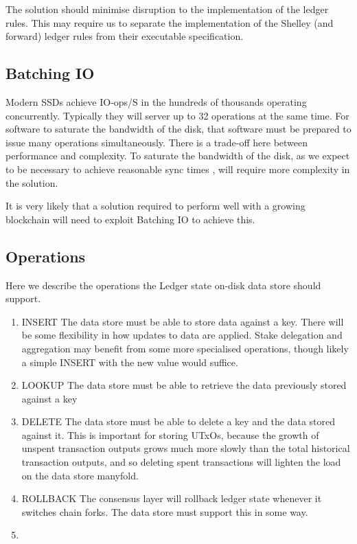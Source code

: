 \documentclass[11pt,a4paper]{article}
\begin{document}
The solution should minimise disruption to the implementation of the ledger
rules. This may require us to separate the implementation of the Shelley (and
forward) ledger rules from their executable specification.

\subsection{Batching IO}
\label{Batching IO}
Modern SSDs achieve IO-ops/S in the hundreds of thousands operating concurrently.
Typically they will server up to 32 operations at the same time. For software to
saturate the bandwidth of the disk, that software must be prepared to issue many
operations simultaneously. There is a trade-off here between performance and
complexity. To saturate the bandwidth of the disk, as we expect to be necessary
to achieve reasonable sync times , will require more complexity in
the solution.

It is very likely that a solution required to perform well with a growing
blockchain will need to exploit Batching IO to achieve this.

\subsection{Operations}
\label{Operations}
Here we describe the operations the Ledger state on-disk data store should
support.

\begin{enumerate}
  \item INSERT
        The data store must be able to store data against a key. There will be
        some flexibility in how updates to data are applied. Stake delegation
        and aggregation may benefit from some more specialised operations,
        though likely a simple INSERT with the new value would suffice.
  \item LOOKUP
        The data store must be able to retrieve the data previously stored
        against a key
  \item DELETE
        The data store must be able to delete a key and the data stored against
        it. This is important for storing UTxOs, because the growth of unspent
        transaction outputs grows much more slowly than the total historical
        transaction outputs, and so deleting spent transactions will lighten the
        load on the data store manyfold.
  \item ROLLBACK
        \label{ROLLBACK}
        The consensus layer will rollback ledger state whenever it switches
        chain forks. The data store must support this in some way.
  \item

\end{enumerate}
\end{document}
